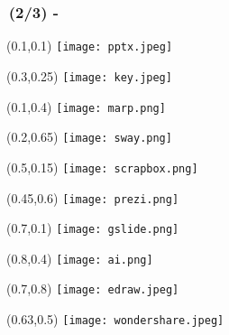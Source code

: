 \documentclass[./main]{subfiles}
\begin{document}
\begin{frame}
  \frametitle{\secname\,(2/3) - \subsecname}

  \begin{textblock*}{0.2\linewidth}(0.1\pagewidth,0.1\pageheight)
    \texttt{[image: pptx.jpeg]}
  \end{textblock*}
  \begin{textblock*}{0.2\linewidth}(0.3\pagewidth,0.25\pageheight)
    \texttt{[image: key.jpeg]}
  \end{textblock*}
  \begin{textblock*}{0.2\linewidth}(0.1\pagewidth,0.4\pageheight)
    \texttt{[image: marp.png]}
  \end{textblock*}
  \begin{textblock*}{0.2\linewidth}(0.2\pagewidth,0.65\pageheight)
    \texttt{[image: sway.png]}
  \end{textblock*}
  \begin{textblock*}{0.2\linewidth}(0.5\pagewidth,0.15\pageheight)
    \texttt{[image: scrapbox.png]}
  \end{textblock*}
  \begin{textblock*}{0.2\linewidth}(0.45\pagewidth,0.6\pageheight)
    \texttt{[image: prezi.png]}
  \end{textblock*}
  \begin{textblock*}{0.2\linewidth}(0.7\pagewidth,0.1\pageheight)
    \texttt{[image: gslide.png]}
  \end{textblock*}
  \begin{textblock*}{0.2\linewidth}(0.8\pagewidth,0.4\pageheight)
    \texttt{[image: ai.png]}
  \end{textblock*}
  \begin{textblock*}{0.2\linewidth}(0.7\pagewidth,0.8\pageheight)
    \texttt{[image: edraw.jpeg]}
  \end{textblock*}
  \begin{textblock*}{0.15\linewidth}(0.63\pagewidth,0.5\pageheight)
    \texttt{[image: wondershare.jpeg]}
  \end{textblock*}

\end{frame}
\end{document}
